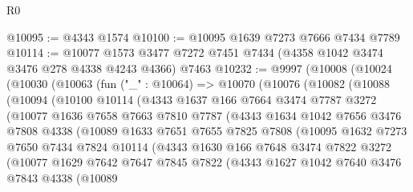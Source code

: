 \begin{lexlean}{R0}
\begin{coremodule}
@10095 := @4343 @1574
@10100 := @10095 @1639 @7273 @7666 @7434 @7789
@10114 := @10077
    @1573
    @3477
    @7272
    @7451
    @7434
    (@4358 @1042 @3474 @3476 @278 @4338 @4243 @4366)
    @7463
@10232 := @9997
    (@10008
      (@10024
        (@10030
          (@10063
            (fun ("_" : @10064) =>
            @10070
              (@10076
                (@10082
                  (@10088
                    (@10094
                      (@10100
                        @10114
                        (@4343
                          @1637
                          @166
                          @7664
                          @3474
                          @7787
                          @3272
                          (@10077
                            @1636
                            @7658
                            @7663
                            @7810
                            @7787
                            (@4343
                              @1634
                              @1042
                              @7656
                              @3476
                              @7808
                              @4338
                              (@10089
                                @1633
                                @7651
                                @7655
                                @7825
                                @7808
                                (@10095
                                  @1632
                                  @7273
                                  @7650
                                  @7434
                                  @7824
                                  @10114
                                  (@4343
                                    @1630
                                    @166
                                    @7648
                                    @3474
                                    @7822
                                    @3272
                                    (@10077
                                      @1629
                                      @7642
                                      @7647
                                      @7845
                                      @7822
                                      (@4343
                                        @1627
                                        @1042
                                        @7640
                                        @3476
                                        @7843
                                        @4338
                                        (@10089

\end{coremodule}
\end{lexlean}
